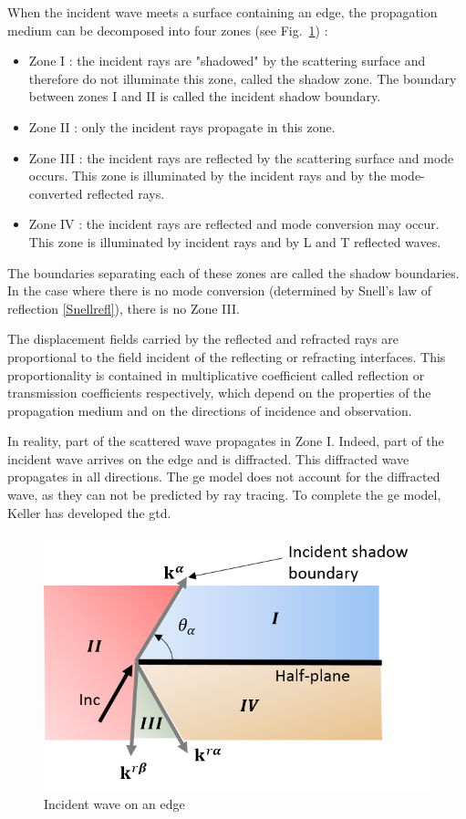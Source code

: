 When the incident wave meets a surface containing an edge, the propagation medium can be decomposed into four zones (see Fig.~\ref{illuzones}) :
\begin{itemize}
	\item Zone I : the incident rays are "shadowed" by the scattering surface and therefore do not illuminate this zone, called the shadow zone. The boundary between zones I and II is called the incident shadow boundary.
    \item Zone II : only the incident rays propagate in this zone.
    \item Zone III :  the incident rays are reflected by the scattering surface and mode occurs. This zone is illuminated by the incident rays and by the mode-converted reflected rays.
    \item Zone IV : the incident rays are reflected and mode conversion may occur. This zone is illuminated by incident rays and by L and T reflected waves.
\end{itemize}
The boundaries separating each of these zones are called the shadow boundaries. In the case where there is no mode conversion (determined by Snell's law of reflection \eqref{Snellrefl}), there is no Zone III. 

The displacement fields carried by the reflected and refracted rays are proportional to the field incident of the reflecting or refracting interfaces. This proportionality is contained in multiplicative coefficient called reflection or transmission coefficients respectively, which depend on the properties of the propagation medium and on the directions of incidence and observation.

In reality, part of the scattered wave propagates in Zone I. Indeed, part of the incident wave arrives on the edge and is diffracted. This diffracted wave propagates in all directions. The \acrshort{ge} model does not account for the diffracted wave, as they can not be predicted by ray tracing. To complete the \acrshort{ge} model, Keller \cite{GTD} has developed the \acrfull{gtd}.

\begin{figure}
    \centering
    \includegraphics[height=0.33\textheight]{images/chapter1/ShadowBoundary.png}
    \caption{Incident wave on an edge}
    \label{illuzones}
\end{figure}

